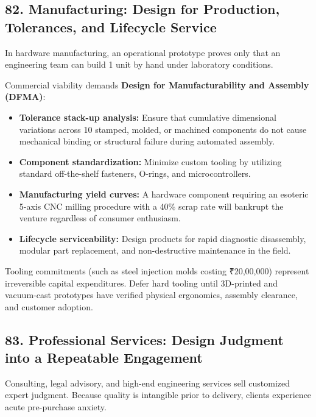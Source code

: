 \subsection*{82. Manufacturing: Design for Production, Tolerances, and Lifecycle Service}

In hardware manufacturing, an operational prototype proves only that an engineering team can build 1 unit by hand under laboratory conditions.

Commercial viability demands \textbf{Design for Manufacturability and Assembly (DFMA)}:
\begin{itemize}
    \item \textbf{Tolerance stack-up analysis:} Ensure that cumulative dimensional variations across 10 stamped, molded, or machined components do not cause mechanical binding or structural failure during automated assembly.
    \item \textbf{Component standardization:} Minimize custom tooling by utilizing standard off-the-shelf fasteners, O-rings, and microcontrollers.
    \item \textbf{Manufacturing yield curves:} A hardware component requiring an esoteric 5-axis CNC milling procedure with a 40\% scrap rate will bankrupt the venture regardless of consumer enthusiasm.
    \item \textbf{Lifecycle serviceability:} Design products for rapid diagnostic disassembly, modular part replacement, and non-destructive maintenance in the field.
\end{itemize}

Tooling commitments (such as steel injection molds costing ₹20,00,000) represent irreversible capital expenditures. Defer hard tooling until 3D-printed and vacuum-cast prototypes have verified physical ergonomics, assembly clearance, and customer adoption.

\subsection*{83. Professional Services: Design Judgment into a Repeatable Engagement}

Consulting, legal advisory, and high-end engineering services sell customized expert judgment. Because quality is intangible prior to delivery, clients experience acute pre-purchase anxiety.


